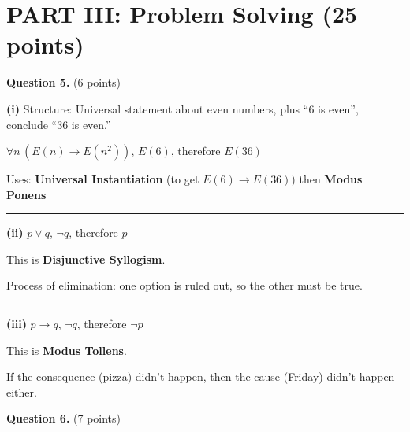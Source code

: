 \documentclass[11pt,a4paper]{article}
\begin{document}
\newpage

\section*{PART III: Problem Solving (25 points)}

\textbf{Question 5.} (6 points)

\begin{solnbox}
\textbf{(i)} Structure: Universal statement about even numbers, plus ``6 is even'', conclude ``36 is even.''

$\forall n\, (E(n) \to E(n^2))$, $E(6)$, therefore $E(36)$

Uses: \textbf{Universal Instantiation} (to get $E(6) \to E(36)$) then \textbf{Modus Ponens}

\rule{\linewidth}{0.3pt}

\textbf{(ii)} $p \lor q$, $\neg q$, therefore $p$

This is \textbf{Disjunctive Syllogism}.

Process of elimination: one option is ruled out, so the other must be true.

\rule{\linewidth}{0.3pt}

\textbf{(iii)} $p \to q$, $\neg q$, therefore $\neg p$

This is \textbf{Modus Tollens}.

If the consequence (pizza) didn't happen, then the cause (Friday) didn't happen either.
\end{solnbox}

\vspace{15pt}

\textbf{Question 6.} (7 points)
\end{document}
